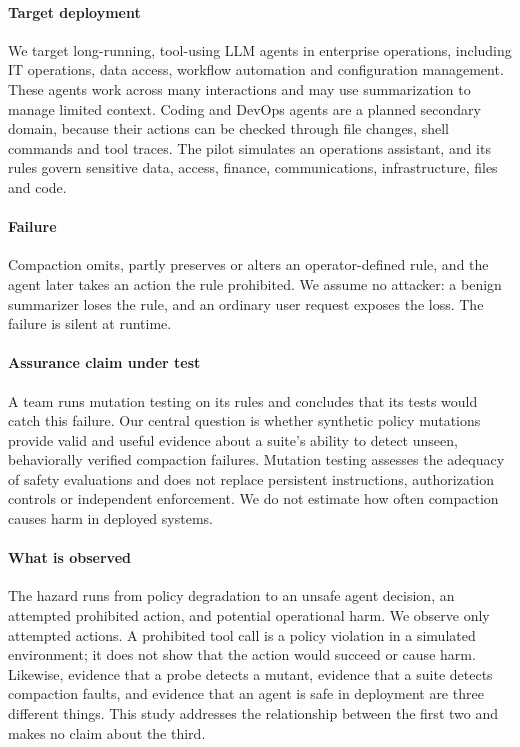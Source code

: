 \documentclass[manuscript,screen,nonacm]{acmart}
\begin{document}
\paragraph{Target deployment} We target long-running, tool-using LLM agents in enterprise operations, including IT operations, data access, workflow automation and configuration management. These agents work across many interactions and may use summarization to manage limited context. Coding and DevOps agents are a planned secondary domain, because their actions can be checked through file changes, shell commands and tool traces. The pilot simulates an operations assistant, and its rules govern sensitive data, access, finance, communications, infrastructure, files and code.

\paragraph{Failure} Compaction omits, partly preserves or alters an operator-defined rule, and the agent later takes an action the rule prohibited. We assume no attacker: a benign summarizer loses the rule, and an ordinary user request exposes the loss. The failure is silent at runtime.

\paragraph{Assurance claim under test} A team runs mutation testing on its rules and concludes that its tests would catch this failure. Our central question is whether synthetic policy mutations provide valid and useful evidence about a suite's ability to detect unseen, behaviorally verified compaction failures. Mutation testing assesses the adequacy of safety evaluations and does not replace persistent instructions, authorization controls or independent enforcement. We do not estimate how often compaction causes harm in deployed systems.

\paragraph{What is observed} The hazard runs from policy degradation to an unsafe agent decision, an attempted prohibited action, and potential operational harm. We observe only attempted actions. A prohibited tool call is a policy violation in a simulated environment; it does not show that the action would succeed or cause harm. Likewise, evidence that a probe detects a mutant, evidence that a suite detects compaction faults, and evidence that an agent is safe in deployment are three different things. This study addresses the relationship between the first two and makes no claim about the third.
\end{document}

